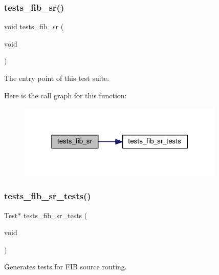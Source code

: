 \subsubsection{\texorpdfstring{tests\+\_\+fib\+\_\+sr()}{tests\_fib\_sr()}}
{\footnotesize\ttfamily void tests\+\_\+fib\+\_\+sr (\begin{DoxyParamCaption}\item[{void}]{ }\end{DoxyParamCaption})}



The entry point of this test suite. 

Here is the call graph for this function\+:
\nopagebreak
\begin{figure}[H]
\begin{center}
\leavevmode
\includegraphics[width=279pt]{group__unittests_ga81367a9f08a307f54d685b422cf97f3d_cgraph}
\end{center}
\end{figure}
\mbox{\label{group__unittests_ga61dfd0327d9f733fa863525f836b9c33}} 
\subsubsection{\texorpdfstring{tests\+\_\+fib\+\_\+sr\+\_\+tests()}{tests\_fib\_sr\_tests()}}
{\footnotesize\ttfamily Test$\ast$ tests\+\_\+fib\+\_\+sr\+\_\+tests (\begin{DoxyParamCaption}\item[{void}]{ }\end{DoxyParamCaption})}



Generates tests for F\+IB source routing. 

